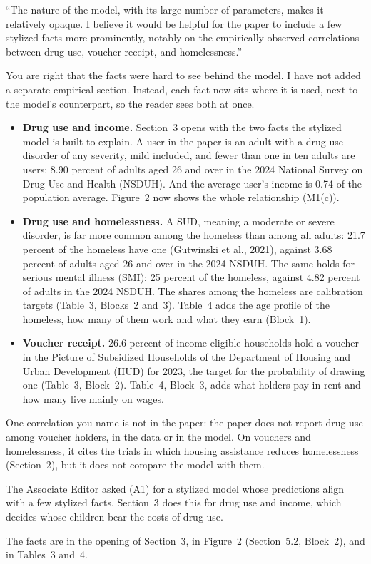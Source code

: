 \documentclass[11pt]{article}
\begin{document}
\begin{referee}
``The nature of the model, with its large number of parameters, makes it
relatively opaque. I believe it would be helpful for the paper to include a few
stylized facts more prominently, notably on the empirically observed correlations
between drug use, voucher receipt, and homelessness.''
\end{referee}
\begin{response}
You are right that the facts were hard to see behind the model. I have not added a
separate empirical section. Instead, each fact now sits where it is used, next to the
model's counterpart, so the reader sees both at once.

\begin{itemize}
\item \textbf{Drug use and income.} Section~3 opens with the two facts the stylized
model is built to explain. A user in the paper is an adult with a drug use disorder of
any severity, mild included, and fewer than one in ten adults are users: 8.90 percent
of adults aged 26 and over in the 2024 National Survey on Drug Use and Health
(NSDUH). And the average user's income is 0.74 of the population average. Figure~2
now shows the whole relationship (M1(c)).
\item \textbf{Drug use and homelessness.} A SUD, meaning a moderate or severe
disorder, is far more common among the homeless than among all adults: 21.7 percent of
the homeless have one (Gutwinski et al., 2021), against 3.68 percent of adults aged 26
and over in the 2024 NSDUH. The same holds for serious mental illness (SMI): 25
percent of the homeless, against 4.82 percent of adults in the 2024 NSDUH. The shares
among the homeless are calibration targets (Table~3, Blocks~2 and~3). Table~4 adds the age
profile of the homeless, how many of them work and what they earn (Block~1).
\item \textbf{Voucher receipt.} 26.6 percent of income eligible households hold a
voucher in the Picture of Subsidized Households of the Department of Housing and Urban
Development (HUD) for 2023, the target for the probability of drawing one (Table~3,
Block~2). Table~4, Block~3, adds what holders pay in rent and how many live mainly on
wages.
\end{itemize}

\open One correlation you name is not in the paper: the paper does not report drug
use among voucher holders, in the data or in the model. On vouchers and homelessness,
it cites the trials in which housing assistance reduces homelessness (Section~2), but
it does not compare the model with them.

The Associate Editor asked (A1) for a stylized model whose predictions align with a
few stylized facts. Section~3 does this for drug use and income, which decides whose
children bear the costs of drug use.

The facts are in the opening of Section~3, in Figure~2 (Section~5.2, Block~2), and in
Tables~3 and~4.
\end{response}
\end{document}
